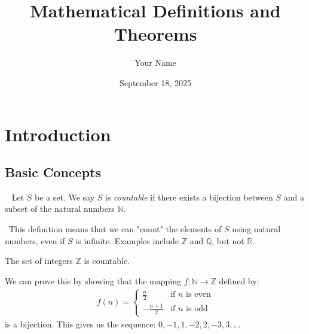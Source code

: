 \documentclass[12pt]{book}
\author{Your Name}
\date{September 18, 2025}
\title{Mathematical Definitions and Theorems}
\newcommand{\R}{\mathbb{R}}
\newcommand{\Z}{\mathbb{Z}}
\newcommand{\btheorem}{\begin{theorem}{}}
\newcommand{\etheorem}{\end{theorem}}
\newcommand{\bdefn}{\begin{definition}{}~}
\newcommand{\edefn}{\end{definition}}
\newcommand{\bexpl}{\begin{explanation}}
\newcommand{\eexpl}{\end{explanation}}
\begin{document}
\maketitle

\chapter{Introduction}
\section{Basic Concepts}

\bdefn
Let $S$ be a set. We say $S$ is \emph{countable} if there exists a bijection between $S$ and a subset of the natural numbers $\mathbb{N}$.
\edefn

\bexpl
~This definition means that we can "count" the elements of $S$ using natural numbers, even if $S$ is infinite. Examples include $\Z$ and $\mathbb{Q}$, but not $\R$.
\eexpl

\btheorem
The set of integers $\Z$ is countable.
\etheorem

\bexpl
We can prove this by showing that the mapping $f: \mathbb{N} \to \Z$ defined by:
\begin{align}
f(n) = \begin{cases} 
\frac{n}{2} & \text{if } n \text{ is even} \\
-\frac{n+1}{2} & \text{if } n \text{ is odd}
\end{cases}
\end{align}
is a bijection. This gives us the sequence: $0, -1, 1, -2, 2, -3, 3, \ldots$
\eexpl
\end{document}
